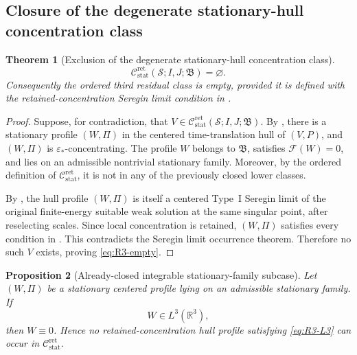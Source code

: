 \documentclass[11pt]{amsart}
\numberwithin{equation}{section}
\theoremstyle{plain}
\newtheorem{theorem}{Theorem}[section]
\newtheorem{proposition}[theorem]{Proposition}
\theoremstyle{definition}
\theoremstyle{remark}
\newcommand{\Cstat}{\mathcal C_{\mathrm{stat}}^{\mathrm{ret}}}
\begin{document}
\subsection{Closure of the degenerate stationary-hull concentration class}

\begin{theorem}[Exclusion of the degenerate stationary-hull concentration class]
\label{thm:R3-exclusion}
\begin{equation}\label{eq:R3-empty}
   \Cstat(\mathcal S;I,J;\mathfrak B)=\varnothing .
\end{equation}
Consequently the ordered third residual class is empty, provided it is defined
with the retained-concentration Seregin limit condition in
.
\end{theorem}

\begin{proof}
Suppose, for contradiction, that
\(V\in\Cstat(\mathcal S;I,J;\mathfrak B)\).  By
, there is a stationary profile \((W,\Pi)\) in the
centered time-translation hull of \((V,P)\), and \((W,\Pi)\) is
\(\varepsilon_*\)-concentrating.  The profile \(W\) belongs to \(\mathfrak B\), satisfies
\(\mathcal F(W)=0\), and lies on an admissible nontrivial stationary family.
Moreover, by the ordered definition of \(\Cstat\), it is not
in any of the previously closed lower classes.

By , the hull profile \((W,\Pi)\) is itself a
centered Type~I Seregin limit of the original finite-energy suitable weak
solution at the same singular point, after reselecting scales.  Since local
concentration is retained, \((W,\Pi)\) satisfies every condition in
.  This contradicts the
Seregin limit occurrence theorem.
Therefore no such \(V\) exists, proving \eqref{eq:R3-empty}.
\end{proof}

\begin{proposition}[Already-closed integrable stationary-family subcase]
\label{prop:R3-L3-subcase}
Let \((W,\Pi)\) be a stationary centered profile lying on an admissible
stationary family.  If
\begin{equation}\label{eq:R3-L3}
   W\in L^3(\mathbb R^3),
\end{equation}
then \(W\equiv0\).  Hence no retained-concentration hull profile satisfying
\eqref{eq:R3-L3} can occur in \(\Cstat\).
\end{proposition}
\end{document}
